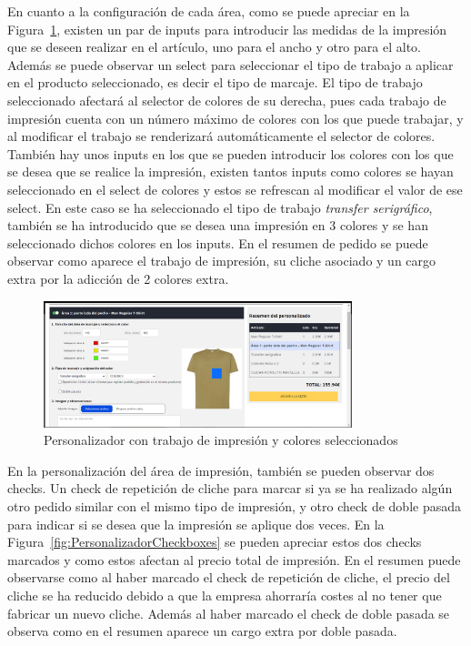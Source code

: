 \documentclass[12pt]{article}
\begin{document}
En cuanto a la configuración de cada área, como se puede apreciar en la Figura~\ref{fig:PersonalizadorColores}, existen un par de inputs para introducir las medidas de la impresión que se deseen 
realizar en el artículo, uno para el ancho y otro para el alto. Además se puede observar un select para seleccionar el tipo de trabajo a aplicar en el producto seleccionado, es decir el tipo de marcaje. El tipo de trabajo seleccionado
afectará al selector de colores de su derecha, pues cada trabajo de impresión cuenta con un número máximo de colores con los que puede trabajar, y al modificar el trabajo se renderizará automáticamente el selector de colores.
También hay unos inputs en los que se pueden introducir los colores con los que se desea que se realice la impresión, existen tantos inputs como colores se hayan seleccionado en el select de colores y estos
se refrescan al modificar el valor de ese select. En este caso se ha seleccionado el tipo de trabajo \textit{transfer serigráfico}, también se ha introducido que se desea una impresión en 3 colores y se han seleccionado dichos colores en los inputs.
En el resumen de pedido se puede observar como aparece el trabajo de impresión, su cliche asociado y un cargo extra por la adicción de 2 colores extra.

\begin{figure}[ht]
    \centering
    \includegraphics[width=0.8\textwidth]{imagenes/ManualUsuario/PersonalizadorArea1ColoresSeleccionados.png}
    \caption{\label{fig:PersonalizadorColores}Personalizador con trabajo de impresión y colores seleccionados}
    \vspace{\fill}
\end{figure}

En la personalización del área de impresión, también se pueden observar dos checks. Un check de repetición de cliche para marcar si ya se ha realizado algún otro pedido similar con el mismo tipo de impresión,
y otro check de doble pasada para indicar si se desea que la impresión se aplique dos veces. En la Figura~\ref{fig:PersonalizadorCheckboxes} se pueden apreciar estos dos checks marcados y como estos
afectan al precio total de impresión. En el resumen puede observarse como al haber marcado el check de repetición de cliche, el precio del cliche se ha reducido debido a que la empresa ahorraría costes al no tener que 
fabricar un nuevo cliche. Además al haber marcado el check de doble pasada se observa como en el resumen aparece un cargo extra por doble pasada.
\end{document}
